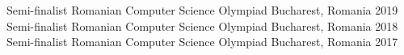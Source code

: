 

\begin{cvhonors}
  \cvhonor
    {Semi-finalist}
    {Romanian Computer Science Olympiad}
    {Bucharest, Romania}
    {2019}
  \cvhonor
    {Semi-finalist}
    {Romanian Computer Science Olympiad}
    {Bucharest, Romania}
    {2018}
  \cvhonor
    {Semi-finalist}
    {Romanian Computer Science Olympiad}
    {Bucharest, Romania}
    {2017}
\end{cvhonors}
